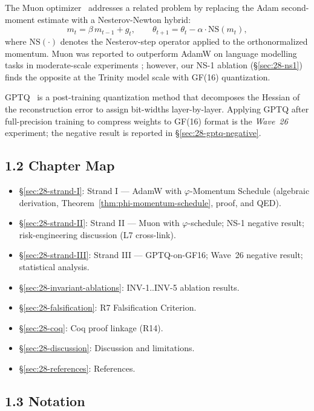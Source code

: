 The Muon optimizer~\cite{jordan_muon_2024} addresses a related problem
by replacing the Adam second-moment estimate with a
Nesterov-Newton hybrid:
\[
  m_t = \beta\, m_{t-1} + g_t,\qquad
  \theta_{t+1} = \theta_t - \alpha \cdot \mathrm{NS}(m_t),
\]
where \(\mathrm{NS}(\cdot)\) denotes the Nesterov-step operator applied
to the orthonormalized momentum.  Muon was reported to outperform AdamW
on language modelling tasks in moderate-scale experiments
\cite{jordan_muon_2024}; however, our NS-1 ablation (§\ref{sec:28-ns1})
finds the opposite at the Trinity model scale with GF(16) quantization.

GPTQ~\cite{frantar_gptq_2023} is a post-training quantization method
that decomposes the Hessian of the reconstruction error to assign
bit-widths layer-by-layer.  Applying GPTQ after full-precision training
to compress weights to GF(16) format is the \emph{Wave~26} experiment;
the negative result is reported in §\ref{sec:28-gptq-negative}.

\subsection{1.2 Chapter Map}

\begin{itemize}
  \item §\ref{sec:28-strand-I}: Strand I — AdamW with \(\varphi\)-Momentum
        Schedule (algebraic derivation, Theorem~\ref{thm:phi-momentum-schedule},
        proof, and QED).
  \item §\ref{sec:28-strand-II}: Strand II — Muon with \(\varphi\)-schedule;
        NS-1 negative result; risk-engineering discussion (L7 cross-link).
  \item §\ref{sec:28-strand-III}: Strand III — GPTQ-on-GF16; Wave~26
        negative result; statistical analysis.
  \item §\ref{sec:28-invariant-ablations}: INV-1..INV-5 ablation results.
  \item §\ref{sec:28-falsification}: R7 Falsification Criterion.
  \item §\ref{sec:28-coq}: Coq proof linkage (R14).
  \item §\ref{sec:28-discussion}: Discussion and limitations.
  \item §\ref{sec:28-references}: References.
\end{itemize}

\subsection{1.3 Notation}

